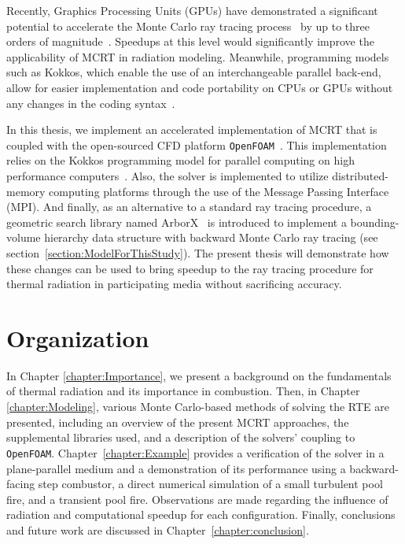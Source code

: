 Recently, Graphics Processing Units (GPUs) have demonstrated a significant potential to accelerate the Monte Carlo ray tracing process~\cite{Howell2021TheTransfer,Humphrey2015ATracing} by up to three orders of magnitude~\cite{Silvestri2019ASimulation}. Speedups at this level would significantly improve the applicability of MCRT in radiation modeling. 
Meanwhile, programming models such as Kokkos, which enable the use of an interchangeable parallel back-end, allow for easier implementation and code portability on CPUs or GPUs without any changes in the coding syntax~\cite{Trott_Kokkos3_2022}.


In this thesis, we implement an accelerated implementation of MCRT that is coupled with the open-sourced CFD platform \verb|OpenFOAM|~\cite{Weller1998ATechniques}.
This implementation relies on the Kokkos programming model for parallel computing on high performance computers~\cite{Trott2021KokkosEra}.
Also, the solver is implemented to utilize distributed-memory computing platforms through the use of the Message Passing Interface (MPI).
And finally, as an alternative to a standard ray tracing procedure, a geometric search library named ArborX~\cite{Lebrun-Grandie2019ArborX:Library} is introduced to implement a bounding-volume hierarchy data structure with backward Monte Carlo ray tracing (see section~\ref{section:ModelForThisStudy}).
The present thesis will demonstrate how these changes can be used to bring speedup to the ray tracing procedure for thermal radiation in participating media without sacrificing accuracy.

\section{Organization}
In Chapter \ref{chapter:Importance}, we present a background on the fundamentals of thermal radiation and its importance in combustion. 
Then, in Chapter \ref{chapter:Modeling}, various Monte Carlo-based methods of solving the RTE are presented, including an overview of the present MCRT approaches, the supplemental libraries used, and a description of the solvers' coupling to \verb|OpenFOAM|. 
Chapter~\ref{chapter:Example} provides a verification of the solver in a plane-parallel medium and a demonstration of its performance using a backward-facing step combustor, a direct numerical simulation of a small turbulent pool fire, and a transient pool fire. Observations are made regarding the influence of radiation and computational speedup for each configuration.
Finally, conclusions and future work are discussed in Chapter~\ref{chapter:conclusion}.